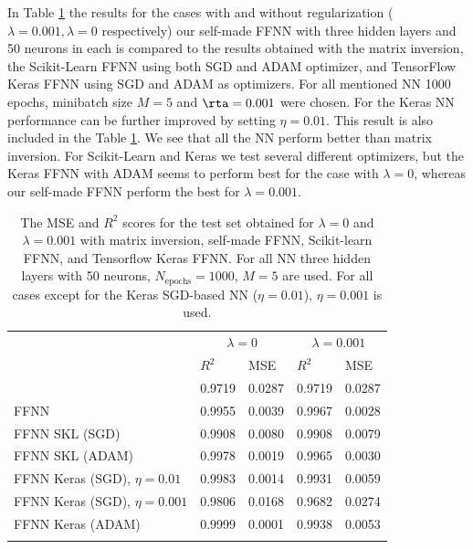 \documentclass{emulateapj}
\begin{document}
In Table \ref{tab:Ols vs ridge vs FFNN and NN} the results for the cases with and without regularization ($\lambda=0.001, \lambda=0$ respectively) our self-made FFNN with three hidden layers and 50 neurons in each is compared to the results obtained with the matrix inversion, the Scikit-Learn FFNN using both SGD and ADAM optimizer, and TensorFlow Keras FFNN using SGD and ADAM as optimizers. For all mentioned NN 1000 epochs, minibatch size $M=5$ and $\rta=0.001$ were chosen. For the Keras NN performance can be further improved by setting $\eta=0.01$. This result is also included in the Table \ref{tab:Ols vs ridge vs FFNN and NN}. We see that all the NN perform better than matrix inversion. For Scikit-Learn and Keras we test several different optimizers, but the Keras FFNN with ADAM seems to perform best for the case with $\lambda=0$, whereas our self-made FFNN perform the best for $\lambda=0.001$.

\begin{table}[!htb]
\begin{center}
\caption{\scriptsize The MSE and $R^2$ scores for the test set obtained for  $\lambda=0$ and $\lambda=0.001$ with matrix inversion, self-made FFNN, Scikit-learn FFNN, and Tensorflow Keras FFNN. For all NN three hidden layers with 50 neurons, $N_{\mathrm{epochs}}=1000$, $M=5$ are used. For all cases except for the Keras SGD-based NN ($\eta=0.01$), $\eta=0.001$ is used.}
\label{tab:Ols vs ridge vs FFNN and NN}  
\begin{tabular}{lllll}
\cline{2-5}\noalign{\smallskip}\cline{2-5}\noalign{\smallskip}
& \multicolumn{2}{c}{$\lambda=0$} & \multicolumn{2}{c}{$\lambda=0.001$} \\ \cline{2-5}\noalign{\smallskip} 
& $R^2$ & MSE & $R^2$ & MSE \\ \hline\noalign{\smallskip}
\multicolumn{1}{l|}{Mat.inv.} & 0.9719 & 0.0287 & 0.9719 & 0.0287\\
\multicolumn{1}{l|}{FFNN} & 0.9955 & 0.0039 & 0.9967 & 0.0028\\
\multicolumn{1}{l|}{FFNN SKL (SGD)} & 0.9908 & 0.0080 & 0.9908 & 0.0079\\
\multicolumn{1}{l|}{FFNN SKL (ADAM)} & 0.9978 & 0.0019 & 0.9965 & 0.0030\\
\multicolumn{1}{l|}{FFNN Keras (SGD), $\eta=0.01$} & 0.9983 & 0.0014 & 0.9931 & 0.0059\\
\multicolumn{1}{l|}{FFNN Keras (SGD), $\eta=0.001$} & 0.9806 & 0.0168 & 0.9682 & 0.0274\\
\multicolumn{1}{l|}{FFNN Keras (ADAM)} & 0.9999 & 0.0001 & 0.9938 & 0.0053\\
 \noalign{\smallskip}\hline
\end{tabular}
\end{center}
\end{table}
\end{document}
